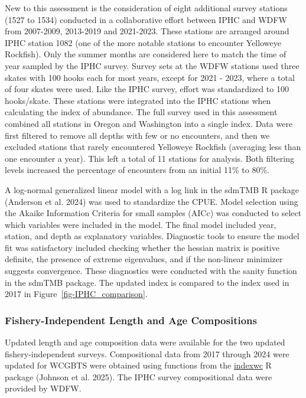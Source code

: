 \documentclass[
]{scrartcl}
\begin{document}
New to this assessment is the consideration of eight additional survey
stations (1527 to 1534) conducted in a collaborative effort between IPHC
and WDFW from 2007-2009, 2013-2019 and 2021-2023. These stations are
arranged around IPHC station 1082 (one of the more notable stations to
encounter Yelloweye Rockfish). Only the summer months are considered
here to match the time of year sampled by the IPHC survey. Survey sets
at the WDFW stations used three skates with 100 hooks each for most
years, except for 2021 - 2023, where a total of four skates were used.
Like the IPHC survey, effort was standardized to 100 hooks/skate. These
stations were integrated into the IPHC stations when calculating the
index of abundance. The full survey used in this assessment combined all
stations in Oregon and Washington into a single index. Data were first
filtered to remove all depths with few or no encounters, and then we
excluded stations that rarely encountered Yelloweye Rockfish (averaging
less than one encounter a year). This left a total of 11 stations for
analysis. Both filtering levels increased the percentage of encounters
from an initial 11\% to 80\%.

A log-normal generalized linear model with a log link in the sdmTMB R
package (Anderson et al. 2024) was used to standardize the CPUE. Model
selection using the Akaike Information Criteria for small samples (AICc)
was conducted to select which variables were included in the model. The
final model included year, station, and depth as explanatory variables.
Diagnostic tools to ensure the model fit was satisfactory included
checking whether the hessian matrix is positive definite, the presence
of extreme eigenvalues, and if the non-linear minimizer suggests
convergence. These diagnostics were conducted with the sanity function
in the sdmTMB package. The updated index is compared to the index used
in 2017 in Figure~\ref{fig-IPHC_comparison}.

\subsubsection{Fishery-Independent Length and Age
Compositions}\label{fishery-independent-length-and-age-compositions}

Updated length and age composition data were available for the two
updated fishery-independent surveys. Compositional data from 2017
through 2024 were updated for WCGBTS were obtained using functions from
the \href{https://github.com/pfmc-assessments/indexwc}{indexwc} R
package (Johnson et al. 2025). The IPHC survey compositional data were
provided by WDFW.
\end{document}
